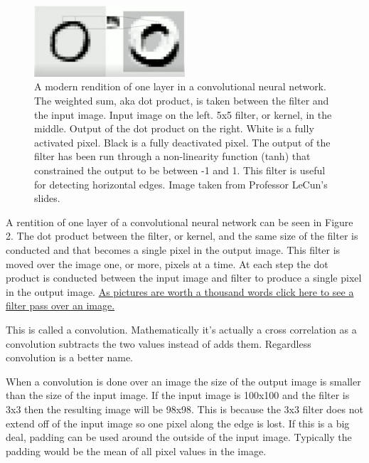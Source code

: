 \documentclass{article}
\begin{document}
\vspace{3mm}

\begin{figure}[ht!]
  \centering
      \includegraphics[width=0.5\textwidth]{ConvnetArch.png}
          \caption{
            A modern rendition of one layer in a convolutional neural network.
            The weighted sum, aka dot product, is taken between the filter and the input image.
            Input image on the left.
            5x5 filter, or kernel, in the middle.
            Output of the dot product on the right.
            White is a fully activated pixel.
            Black is a fully deactivated pixel.
            The output of the filter has been run through a non-linearity function (tanh) that constrained the output to be between -1 and 1.
            This filter is useful for detecting horizontal edges.
            Image taken from Professor LeCun's slides.
          }
\end{figure}

\noindent A rentition of one layer of a convolutional neural network can be seen in Figure 2.
The dot product between the filter, or kernel, and the same size of the filter is conducted and that becomes a single pixel in the output image.
This filter is moved over the image one, or more, pixels at a time.
At each step the dot product is conducted between the input image and filter to produce a single pixel in the output image.
\href{https://cdn-images-1.medium.com/max/1600/1*ZCjPUFrB6eHPRi4eyP6aaA.gif}{As pictures are worth a thousand words click here to see a filter pass over an image.}

\vspace{3mm}

\noindent This is called a convolution.
Mathematically it's actually a cross correlation as a convolution subtracts the two values instead of adds them.
Regardless convolution is a better name.

\vspace{3mm}

\noindent When a convolution is done over an image the size of the output image is smaller than the size of the input image.
If the input image is 100x100 and the filter is 3x3 then the resulting image will be 98x98.
This is because the 3x3 filter does not extend off of the input image so one pixel along the edge is lost.
If this is a big deal, padding can be used around the outside of the input image.
Typically the padding would be the mean of all pixel values in the image.
\end{document}

